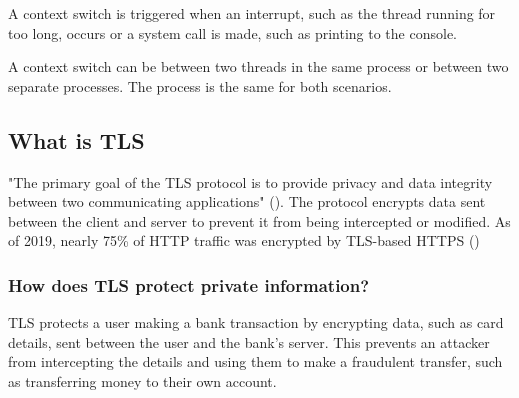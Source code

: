 \documentclass{article}
\begin{document}
A context switch is triggered when an interrupt, such as the thread
running for too long, occurs or a system call is made, such as printing
to the console.

A context switch can be between two threads in the same process or between
two separate processes. The process is the same for both scenarios.



\subsection{What is TLS}
"The primary goal of the TLS protocol is to provide privacy and data integrity between
two communicating applications" (\cite{rescorla_transport_2008}). The protocol encrypts
data sent between the client and server to prevent it from being intercepted or modified.
As of 2019, nearly 75\% of HTTP traffic was encrypted by TLS-based HTTPS (\cite{greg_ferro_percentage_2019})

    \subsubsection{How does TLS protect private information?}
    TLS protects a user making a bank transaction by encrypting data, such as card
    details, sent between the user and the bank's server. This prevents an attacker from
    intercepting the details and using them to make a fraudulent transfer, such as transferring
    money to their own account.

    
\end{document}
